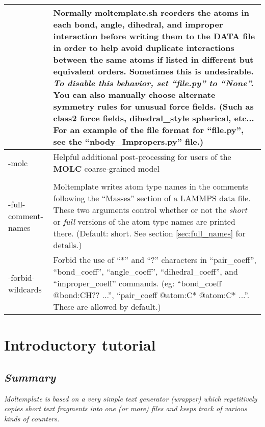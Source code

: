 \documentclass[11pt]{article}
\begin{document}
\begin{longtable}[h]{l|p{10cm}}
& 
Normally moltemplate.sh reorders the atoms in each bond, angle, dihedral, and improper interaction before writing them to the DATA file in order to help avoid duplicate interactions between the same atoms if listed in different but equivalent orders.  Sometimes this is undesirable.  \textit{\textbf{To disable this behavior, set ``file.py'' to ``None''.}}  You can also manually choose alternate symmetry rules for unusual force fields. (Such as class2 force fields, dihedral\_style spherical, etc...  For an example of the file format for ``file.py'', see the ``nbody\_Impropers.py'' file.)
\\
\hline
-molc &
Helpful additional post-processing for users of the \textbf{MOLC}
coarse-grained model
\\
\hline
\begin{tabular}[t]{l}
-short-comment-names
\\
-full-comment-names
\end{tabular}
&
Moltemplate writes atom type names in the comments following
the ``Masses'' section of a LAMMPS data file.
These two arguments control whether or not the \textit{short}
or \textit{full} versions of the atom type names are printed there.
(Default: short. See section \ref{sec:full_names} for details.)
\\
\hline
-forbid-wildcards &
Forbid the use of ``*'' and ``?'' characters in
``pair\_coeff'', ``bond\_coeff'', ``angle\_coeff'', ``dihedral\_coeff'',
and ``improper\_coeff'' commands.  (eg: ``bond\_coeff @bond:CH?? ...'', ``pair\_coeff @atom:C* @atom:C* ...''.  These are allowed by default.)
\\
\end{longtable}


\pagebreak




\section{Introductory tutorial}
\label{sec:tutorial}
\subsection*{\textit{Summary}}
\textit{Moltemplate is based on a very simple text generator (wrapper) which 
repetitively copies short text fragments into one (or more) files 
and keeps track of various kinds of counters.}
\end{document}
